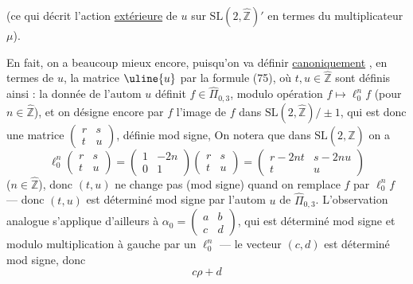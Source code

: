 
(ce qui décrit l'action \uline{extérieure} de $u$ sur
$\mathrm{SL}(2,\widehat{\mathbb Z})'$ en termes du multiplicateur $\mu$).


En fait, on a beaucoup mieux encore,
puisqu'on va définir \uline{canoniquement}
,
en termes de $u$, la matrice $\uline{u}$ par la
formule (75), où  $t,u\in\widehat{\mathbb Z}$ sont
définis ainsi :  la donnée de l'autom $u$
définit $f\in\widehat{\Pi}_{0,3}$, modulo opération $f\mapsto\ell_0^n f$
(pour $n\in\widehat{\mathbb Z}$), et on désigne encore par $f$
l'image de $f$ dans $\mathrm{SL}(2,\widehat{\mathbb Z})/\pm1$, qui est donc
une matrice $\begin{pmatrix}r&s\\t&u\end{pmatrix}$, définie mod signe,
On notera que dans $\mathrm{SL}(2,\widehat{\mathbb Z})$ on a
\[
\ell_0^n\begin{pmatrix}r&s\\t&u\end{pmatrix}
=\begin{pmatrix}1&-2n\\0&1\end{pmatrix}
\begin{pmatrix}r&s\\t&u\end{pmatrix}
=\begin{pmatrix}r-2nt&s-2nu\\t&u\end{pmatrix}
\tag{79}
\]
($n\in\widehat{\mathbb Z}$), donc $(t,u)$ ne change pas (mod signe)
quand on remplace $f$ par $\ell_0^n f$ --- donc $(t,u)$
est déterminé mod signe par l'autom $u$
de $\widehat{\Pi}_{0,3}$.  L'observation analogue s'applique
d'ailleurs à $\alpha_0=\begin{pmatrix}a&b\\c&d\end{pmatrix}$, qui est déterminé
mod signe et modulo multiplication à gauche
par un $\ell_0^n$ --- le  vecteur $(c,d)$ est
déterminé mod signe, donc 
\[
c\rho+d
\]

